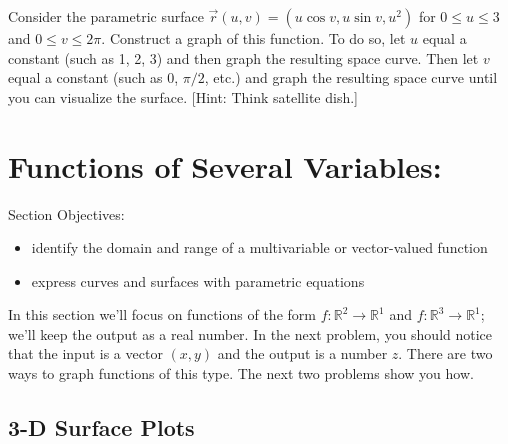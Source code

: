 \begin{challenge}\label{second parametric surface example}%
%
 Consider the parametric surface $\vec r(u,v)=(u\cos v, u\sin v, u^2)$ for $0\leq u\leq 3$ and $0\leq v\leq 2 \pi$.
 Construct a graph of this function. To do so, let $u$ equal a constant (such as 1, 2, 3) and then graph the resulting space curve.  Then let $v$ equal a constant (such as 0, $\pi/2$, etc.) and graph the resulting space curve until you can visualize the surface. [Hint: Think satellite dish.] 
\end{challenge}
%
%

\section{Functions of Several Variables:} %
Section Objectives:
\begin{itemize}
\item identify the domain and range of a multivariable or vector-valued function
\item express curves and surfaces with parametric equations
\end{itemize}

In this section we'll focus on functions of the form $f\colon \mathbb{R}^2\to\mathbb{R}^1$ and $f\colon \mathbb{R}^3\to\mathbb{R}^1$; we'll keep the output as a real number. In the next problem, you should notice that the input is a vector $(x,y)$ and the output is a number $z$. There are two ways to graph functions of this type.  The next two problems show you how. 

\subsection{3-D Surface Plots}

